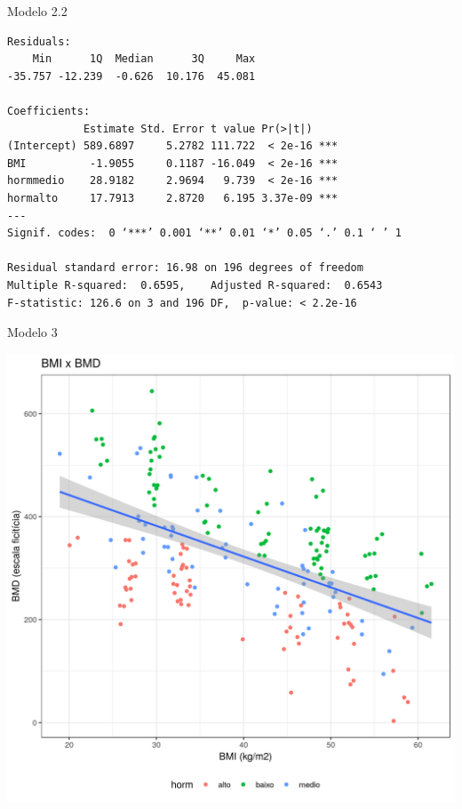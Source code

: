 \documentclass{beamer}
\begin{document}
\begin{frame}[fragile]{}
  \begin{center}
    \begin{exampleblock}{Modelo 2.2}
      \tiny
\begin{verbatim}
Residuals:
    Min      1Q  Median      3Q     Max 
-35.757 -12.239  -0.626  10.176  45.081 

Coefficients:
            Estimate Std. Error t value Pr(>|t|)    
(Intercept) 589.6897     5.2782 111.722  < 2e-16 ***
BMI          -1.9055     0.1187 -16.049  < 2e-16 ***
hormmedio    28.9182     2.9694   9.739  < 2e-16 ***
hormalto     17.7913     2.8720   6.195 3.37e-09 ***
---
Signif. codes:  0 ‘***’ 0.001 ‘**’ 0.01 ‘*’ 0.05 ‘.’ 0.1 ‘ ’ 1

Residual standard error: 16.98 on 196 degrees of freedom
Multiple R-squared:  0.6595,	Adjusted R-squared:  0.6543 
F-statistic: 126.6 on 3 and 196 DF,  p-value: < 2.2e-16
\end{verbatim}
    \end{exampleblock}
  \end{center}
\end{frame}

\begin{frame}{\small Modelo 3}
  \begin{center}
    \includegraphics[height=.9\textheight]{Cap31-32/pratica-rlm3}
  \end{center}
\end{frame}
\end{document}
